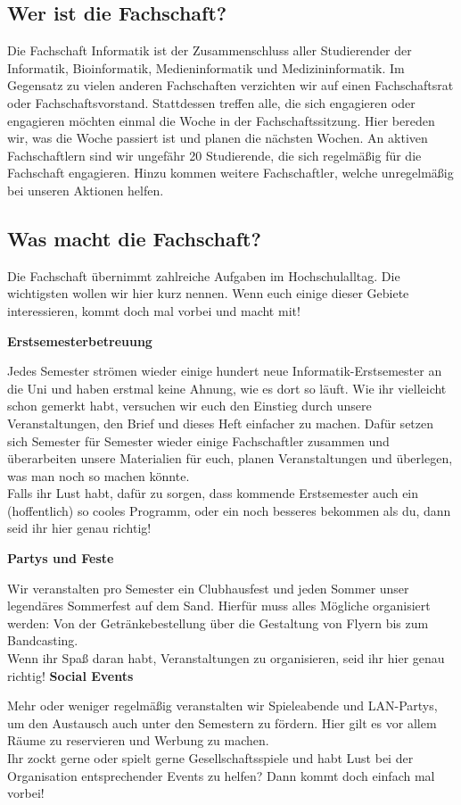 \subsection{Wer ist die Fachschaft?}
Die Fachschaft Informatik ist der Zusammenschluss aller Studierender der Informatik, Bioinformatik, Medieninformatik und Medizininformatik. Im Gegensatz zu vielen anderen Fachschaften verzichten wir auf einen Fachschaftsrat oder Fachschaftsvorstand. Stattdessen treffen alle, die sich engagieren oder engagieren möchten einmal die Woche in der Fachschaftssitzung. Hier bereden wir, was die Woche passiert ist und planen die nächsten Wochen. An aktiven Fachschaftlern sind wir ungefähr 20 Studierende, die sich regelmäßig für die Fachschaft engagieren. Hinzu kommen weitere Fachschaftler, welche unregelmäßig bei unseren Aktionen helfen.
\subsection{Was macht die Fachschaft?}
Die Fachschaft übernimmt zahlreiche Aufgaben im Hochschulalltag. Die wichtigsten wollen wir hier kurz nennen. Wenn euch einige dieser Gebiete interessieren, kommt doch mal vorbei und macht mit!

\textbf{Erstsemesterbetreuung}

Jedes Semester strömen wieder einige hundert neue Informatik-Erstsemester an die Uni und haben erstmal keine Ahnung, wie es dort so läuft. Wie ihr vielleicht schon gemerkt habt, versuchen wir euch den Einstieg durch unsere Veranstaltungen, den Brief und dieses Heft einfacher zu machen. Dafür setzen sich Semester für Semester wieder einige Fachschaftler zusammen und überarbeiten unsere Materialien für euch, planen Veranstaltungen und überlegen, was man noch so machen könnte.\\
Falls ihr Lust habt, dafür zu sorgen, dass kommende Erstsemester auch ein (hoffentlich) so cooles Programm, oder ein noch besseres bekommen als du, dann seid ihr hier genau richtig!

\textbf{Partys und Feste}

Wir veranstalten pro Semester ein Clubhausfest und jeden Sommer unser legendäres Sommerfest auf dem Sand. Hierfür muss alles Mögliche organisiert werden: Von der Getränkebestellung über die Gestaltung von Flyern bis zum Bandcasting. \\
Wenn ihr Spaß daran habt, Veranstaltungen zu organisieren, seid ihr hier genau richtig!
\vfill \pagebreak
\textbf{Social Events}

Mehr oder weniger regelmäßig veranstalten wir Spieleabende und LAN-Partys, um den Austausch auch unter den Semestern zu fördern. Hier gilt es vor allem Räume zu reservieren und Werbung zu machen. \\
Ihr zockt gerne oder spielt gerne Gesellschaftsspiele und habt Lust bei der Organisation entsprechender Events zu helfen? Dann kommt doch einfach mal vorbei!

